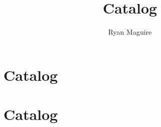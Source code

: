 \documentclass[crop=false,class=book,oneside]{standalone}
\begin{document}
    \ifx\ifplanetdiff\undefined
        \newif\iffunct
        \title{Catalog}
        \author{Ryan Maguire}
        \date{\vspace{-5ex}}
        \maketitle
        \tableofcontents
        \clearpage
        \chapter*{Catalog}
        \setcounter{chapter}{6}
    \else
        \chapter{Catalog}
    \fi
\end{document}
